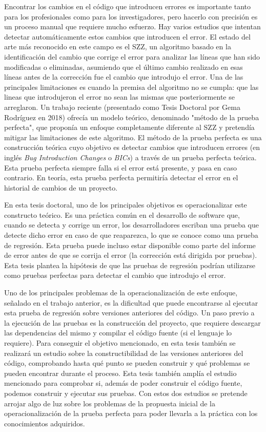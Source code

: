 Encontrar los cambios en el código que introducen errores es importante tanto para los profesionales como para los investigadores, pero hacerlo con precisión es un proceso manual que requiere mucho esfuerzo.
Hay varios estudios que intentan detectar automáticamente estos cambios que introducen el error. 
El estado del arte más reconocido en este campo es el SZZ, un algoritmo basado en la identificación del cambio que corrige el error para analizar las líneas que han sido modificadas o eliminadas, asumiendo que el último cambio realizado en esas líneas antes de la corrección fue el cambio que introdujo el error. 
Una de las principales limitaciones es cuando la premisa del algoritmo no se cumpla: que las lineas que introdujeron el error no sean las mismas que posteriormente se arreglaron.
Un trabajo reciente (presentado como Tesis Doctoral por Gema Rodríguez en 2018) ofrecía un modelo teórico, denominado "método de la prueba perfecta", que proponía un enfoque completamente diferente al SZZ y pretendía mitigar las limitaciones de este algoritmo. 
El método de la prueba perfecta es una construcción teórica cuyo objetivo es detectar cambios que introducen errores (en inglés \textit{Bug Introduction Changes} o \textit{BICs}) a través de un prueba perfecta teórica. 
Esta prueba perfecta siempre falla si el error está presente, y pasa en caso contrario.
En teoría, esta prueba perfecta permitiría detectar el error en el historial de cambios de un proyecto.

En esta tesis doctoral, uno de los principales objetivos es operacionalizar este constructo teórico.
Es una práctica común en el desarrollo de software que, cuando se detecta y corrige un error, los desarrolladores escriban una prueba que detecte dicho error en caso de que reaparezca, lo que se conoce como una prueba de regresión. 
Esta prueba puede incluso estar disponible como parte del informe de error antes de que se corrija el error (la corrección está dirigida por pruebas). 
Esta tesis plantea la hipótesis de que las pruebas de regresión podrían utilizarse como pruebas perfectas para detectar el cambio que introdujo el error.

Uno de los principales problemas de la operacionalización de este enfoque, señalado en el trabajo anterior, es la dificultad que puede encontrarse al ejecutar esta prueba de regresión sobre versiones anteriores del código. 
Un paso previo a la ejecución de las pruebas es la construcción del proyecto, que requiere descargar las dependencias del mismo y compilar el código fuente (si el lenguaje lo requiere). 
Para conseguir el objetivo mencionado, en esta tesis también se realizará un estudio sobre la constructibilidad de las versiones anteriores del código, comprobando hasta qué punto se pueden construir y qué problemas se pueden encontrar durante el proceso.
Esta tesis también amplía el estudio mencionado para comprobar si, además de poder construir el código fuente, podemos construir y ejecutar sus pruebas. 
Con estos dos estudios se pretende arrojar algo de luz sobre los problemas de la propuesta inicial de la operacionalización de la prueba perfecta para poder llevarla a la práctica con los conocimientos adquiridos.

